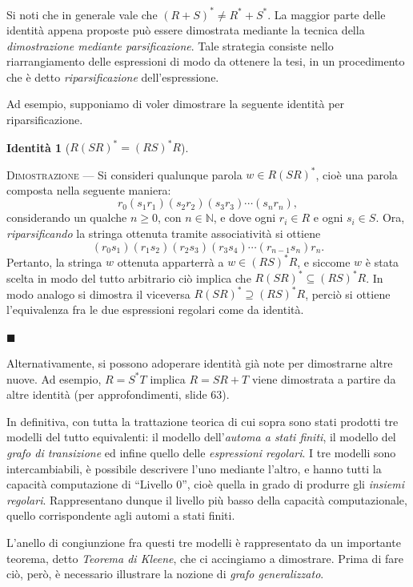 \documentclass[10pt]{\classname}
\theoremstyle{newlinethm}
\theoremstyle{theorem}
\theoremstyle{definition}
\theoremstyle{definition}
\theoremstyle{definition}
\newtheorem{identita}{Identità}[section]
\theoremstyle{definition}
\begin{document}
Si noti che in generale vale che $(R + S)^* \neq R^* + S^*$. La maggior parte
delle identità appena proposte può essere dimostrata mediante la tecnica della
\emph{dimostrazione mediante parsificazione}. Tale strategia consiste nello
riarrangiamento delle espressioni di modo da ottenere la tesi, in un
procedimento che è detto \emph{riparsificazione} dell'espressione.

\clearpage

Ad esempio, supponiamo di voler dimostrare la seguente identità per riparsificazione.

\begin{identita}[$R(SR)^* = (RS)^* R$]
\end{identita}

\textsc{Dimostrazione } --- Si consideri qualunque parola $w \in R(SR)^*$, cioè
una parola composta nella seguente maniera:
$$r_0(s_1r_1)(s_2r_2)(s_3r_3)\cdots(s_nr_n),$$ considerando un qualche $n \geq
0$, con $n \in \mathbb{N}$, e dove ogni $r_i \in R$ e ogni $s_i \in S$. Ora,
\emph{riparsificando} la stringa ottenuta tramite associatività si ottiene
$$(r_0s_1)(r_1s_2)(r_2s_3)(r_3s_4)\cdots(r_{n-1}s_n)r_n.$$ Pertanto, la stringa
$w$ ottenuta apparterrà a $w \in (RS)^*R$, e siccome $w$ è stata scelta in modo
del tutto arbitrario ciò implica che $R(SR)^* \subseteq (RS)^* R$. In modo
analogo si dimostra il viceversa $R(SR)^* \supseteq (RS)^* R$, perciò si
ottiene l'equivalenza fra le due espressioni regolari come da identità.

\begin{flushright}
$\blacksquare$
\end{flushright}

Alternativamente, si possono adoperare identità già note per dimostrarne altre
nuove. Ad esempio, $R = S^* T$ implica $R = SR + T$ viene dimostrata a partire
da altre identità (per approfondimenti, slide 63).

In definitiva, con tutta la trattazione teorica di cui sopra sono stati
prodotti tre modelli del tutto equivalenti: il modello dell'\emph{automa a
stati finiti}, il modello del \emph{grafo di transizione} ed infine quello
delle \emph{espressioni regolari}. I tre modelli sono intercambiabili, è
possibile descrivere l'uno mediante l'altro, e hanno tutti la capacità
computazione di ``Livello 0'', cioè quella in grado di produrre gli \emph{insiemi
regolari}. Rappresentano dunque il livello più basso della capacità
computazionale, quello corrispondente agli automi a stati finiti.

L'anello di congiunzione fra questi tre modelli è rappresentato da un
importante teorema, detto \emph{Teorema di Kleene}, che ci accingiamo a
dimostrare. Prima di fare ciò, però, è necessario illustrare la nozione di
\emph{grafo generalizzato}.
\end{document}
